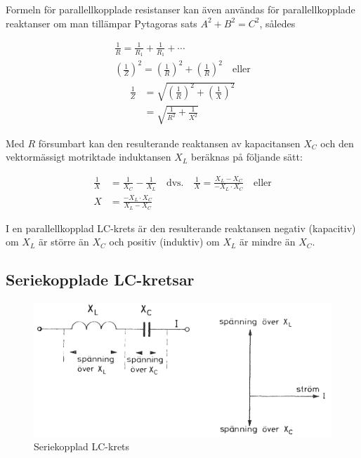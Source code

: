 Formeln för parallellkopplade resistanser kan även användas för
parallellkopplade reaktanser om man tillämpar Pytagoras sats
\(A^2 + B^2 = C^2\), således

\begin{gather*}
  \frac{1}{R} = \frac{1}{R_1} + \frac{1}{R_1} + \cdots \\
  \left(\frac{1}{Z}\right)^2 = \left(\frac{1}{R}\right)^2 +
  \left(\frac{1}{R}\right)^2 \quad \text{eller}
\end{gather*}
\begin{align*}
  \frac{1}{Z} &=
  \sqrt{\left(\frac{1}{R}\right)^2 + \left(\frac{1}{X}\right)^2} \\
  &= \sqrt{\frac{1}{R^2} + \frac{1}{X^2}}
\end{align*}

Med \(R\) försumbart kan den resulterande reaktansen av kapacitansen \(X_C\)
och den vektormässigt motriktade induktansen \(X_L\) beräknas på följande sätt:

\begin{align*}
  \frac{1}{X} &= \frac{1}{X_C} - \frac{1}{X_L} \quad \text{dvs.} \quad
  \frac{1}{X} = \frac{X_L - X_C}{-X_L \cdot X_C} \quad \text{eller} \\
  X &= \frac{-X_L \cdot X_C}{X_L - X_C}
\end{align*}

I en parallellkopplad LC-krets är den resulterande reaktansen negativ
(kapacitiv) om \(X_L\) är större än \(X_C\) och positiv (induktiv) om \(X_L\) är
mindre än \(X_C\).

\subsection{Seriekopplade LC-kretsar}

\begin{figure}
\includegraphics[width=\textwidth]{images/cropped_pdfs/bild_2_3-16.pdf}
\caption{Seriekopplad LC-krets}
\label{fig:BildII3-16}
\end{figure}

